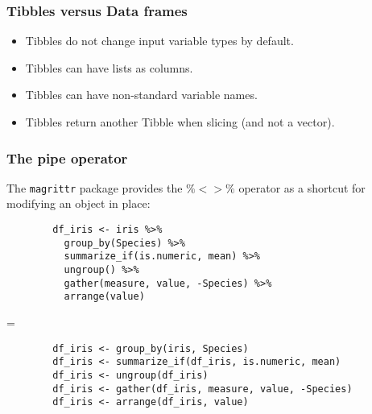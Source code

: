 \documentclass{beamer}
\begin{document}
	\begin{frame}
		\frametitle{Tibbles versus Data frames}

		\begin{itemize}
		\setlength{\itemsep}{1em}
			\item Tibbles do not change input variable types by default.
			\item Tibbles can have lists as columns.
			\item Tibbles can have non-standard variable names.
			\item Tibbles return another Tibble when slicing (and not a vector).
		\end{itemize}

	\end{frame}

	\begin{frame}[fragile]
		\frametitle{The pipe operator}

		The \verb|magrittr| package provides the $\%<>\%$ operator as a shortcut for modifying an object in place:

		\vspace{1em}

		\begin{exampleblock}{}
		\begin{center}
		\begin{BVerbatim}
		df_iris <- iris %
		  group_by(Species) %
		  summarize_if(is.numeric, mean) %
		  ungroup() %
		  gather(measure, value, -Species) %
		  arrange(value)
		\end{BVerbatim}
		\end{center}
		\end{exampleblock}{}

		=

		\begin{exampleblock}{}
		\begin{center}
		\begin{BVerbatim}
		df_iris <- group_by(iris, Species)
		df_iris <- summarize_if(df_iris, is.numeric, mean)
		df_iris <- ungroup(df_iris)
		df_iris <- gather(df_iris, measure, value, -Species)
		df_iris <- arrange(df_iris, value)
		\end{BVerbatim}
		\end{center}
		\end{exampleblock}{}

	\end{frame}

	\begin{frame}

	\end{frame}

	\begin{frame}
%

	\end{frame}
\end{document}
